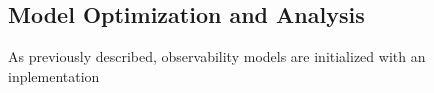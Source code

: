 \subsection{Model Optimization and Analysis}

As previously described, observability models are initialized with an inplementation

\subsubsection{}